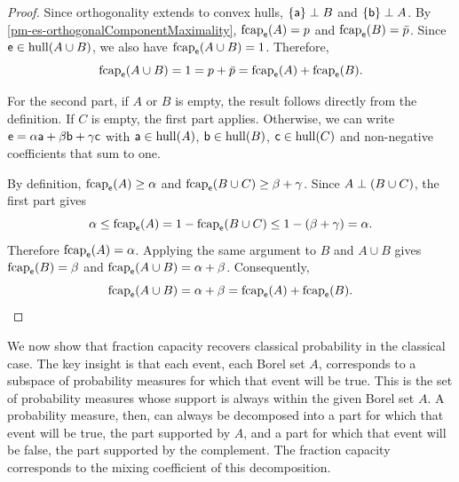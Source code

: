 \begin{mathSection}
\begin{proof}
	Since orthogonality extends to convex hulls, $\{\ens[a]\} \ortho B$ and $\{\ens[b]\} \ortho A$. By \ref{pm-es-orthogonalComponentMaximality}, $\fcap_{\ens}(A)=p$ and $\fcap_{\ens}(B)=\bar{p}$.
	Since $\ens \in \hull(A \cup B)$, we also have $\fcap_{\ens}(A \cup B)=1$. Therefore,
	\begin{equation}
		\fcap_{\ens}(A \cup B) = 1 = p + \bar{p} = \fcap_{\ens}(A) + \fcap_{\ens}(B).
	\end{equation}
	
	For the second part, if $A$ or $B$ is empty, the result follows directly from the definition. If $C$ is empty, the first part applies. Otherwise, we can write $\ens = \alpha\ens[a] + \beta\ens[b] + \gamma\ens[c]$ with $\ens[a] \in \hull(A)$, $\ens[b] \in \hull(B)$, $\ens[c] \in \hull(C)$ and non-negative coefficients that sum to one.
	
	By definition, $\fcap_{\ens}(A) \geq \alpha$ and $\fcap_{\ens}(B \cup C) \geq \beta+\gamma$. Since $A \ortho (B \cup C)$, the first part gives
	\begin{equation}
		\alpha
		\leq \fcap_{\ens}(A)
		= 1-\fcap_{\ens}(B \cup C)
		\leq 1-(\beta+\gamma)
		= \alpha.
	\end{equation}
	Therefore $\fcap_{\ens}(A)=\alpha$. Applying the same argument to $B$ and $A \cup B$ gives $\fcap_{\ens}(B)=\beta$ and $\fcap_{\ens}(A \cup B)=\alpha+\beta$. Consequently,
	\begin{equation}
		\fcap_{\ens}(A \cup B)
		= \alpha+\beta
		= \fcap_{\ens}(A)+\fcap_{\ens}(B).
	\end{equation}
\end{proof}
\end{mathSection}

We now show that fraction capacity recovers classical probability in the classical case. The key insight is that each event, each Borel set $A$, corresponds to a subspace of probability measures for which that event will be true. This is the set of probability measures whose support is always within the given Borel set $A$. A probability measure, then, can always be decomposed into a part for which that event will be true, the part supported by $A$, and a part for which that event will be false, the part supported by the complement. The fraction capacity corresponds to the mixing coefficient of this decomposition.

